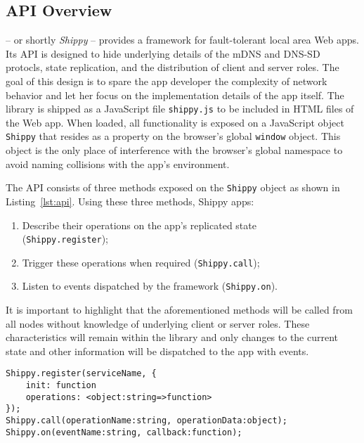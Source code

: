 \subsection{API Overview}
\label{sub:approach_api_overview}

\APIName -- or shortly \textit{Shippy} -- provides a framework for fault-tolerant local area Web apps.
Its API is designed to hide underlying details of the mDNS and DNS-SD protocls, state replication, and the distribution of client and server roles.
The goal of this design is to spare the app developer the complexity of network behavior and let her focus on the implementation details of the app itself.
The library is shipped as a JavaScript file \texttt{shippy.js} to be included in HTML files of the Web app.
When loaded, all functionality is exposed on a JavaScript object \texttt{Shippy} that resides as a property on the browser's global \texttt{window} object.
This object is the only place of interference with the browser's global namespace to avoid naming collisions with the app's environment.

The API consists of three methods exposed on the \texttt{Shippy} object as shown in Listing~\ref{lst:api}.
Using these three methods, Shippy apps:

\begin{enumerate}
    \item Describe their operations on the app's replicated state \\ (\texttt{Shippy.register});
    \item Trigger these operations when required (\texttt{Shippy.call});
    \item Listen to events dispatched by the framework (\texttt{Shippy.on}).
\end{enumerate}


It is important to highlight that the aforementioned methods will be called from all nodes without knowledge of underlying client or server roles.
These characteristics will remain within the library and only changes to the current state and other information will be dispatched to the app with events.

\begin{lstlisting}[caption={\APIName API},label={lst:api}]
Shippy.register(serviceName, {
    init: function
    operations: <object:string=>function>
});
Shippy.call(operationName:string, operationData:object);
Shippy.on(eventName:string, callback:function);
\end{lstlisting}

